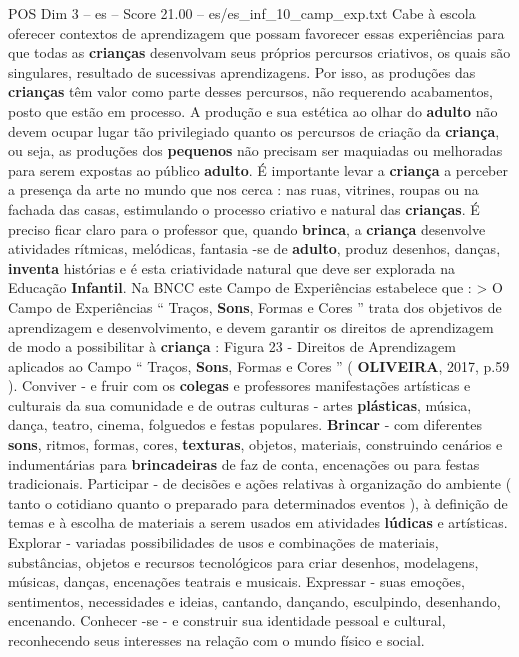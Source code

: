 \begin{textsample}{POS Dim 3 – es – Score 21.00 – es/es\_inf\_10\_camp\_exp.txt}
Cabe à escola oferecer contextos de aprendizagem que possam favorecer essas experiências para que todas as \textbf{crianças} desenvolvam seus próprios percursos criativos, os quais são singulares, resultado de sucessivas aprendizagens.
Por isso, as produções das \textbf{crianças} têm valor como parte desses percursos, não requerendo acabamentos, posto que estão em processo.
A produção e sua estética ao olhar do \textbf{adulto} não devem ocupar lugar tão privilegiado quanto os percursos de criação da \textbf{criança}, ou seja, as produções dos \textbf{pequenos} não precisam ser maquiadas ou melhoradas para serem expostas ao público \textbf{adulto}.
É importante levar a \textbf{criança} a perceber a presença da arte no mundo que nos cerca : nas ruas, vitrines, roupas ou na fachada das casas, estimulando o processo criativo e natural das \textbf{crianças}.
É preciso ficar claro para o professor que, quando \textbf{brinca}, a \textbf{criança} desenvolve atividades rítmicas, melódicas, fantasia -se de \textbf{adulto}, produz desenhos, danças, \textbf{inventa} histórias e é esta criatividade natural que deve ser explorada na Educação \textbf{Infantil}.
Na BNCC este Campo de Experiências estabelece que : > O Campo de Experiências “ Traços, \textbf{Sons}, Formas e Cores ” trata dos objetivos de aprendizagem e desenvolvimento, e devem garantir os direitos de aprendizagem de modo a possibilitar à \textbf{criança} : Figura 23 - Direitos de Aprendizagem aplicados ao Campo “ Traços, \textbf{Sons}, Formas e Cores ” ( \textbf{OLIVEIRA}, 2017, p.59 ).
Conviver - e fruir com os \textbf{colegas} e professores manifestações artísticas e culturais da sua comunidade e de outras culturas - artes \textbf{plásticas}, música, dança, teatro, cinema, folguedos e festas populares. \textbf{Brincar} - com diferentes \textbf{sons}, ritmos, formas, cores, \textbf{texturas}, objetos, materiais, construindo cenários e indumentárias para \textbf{brincadeiras} de faz de conta, encenações ou para festas tradicionais.
Participar - de decisões e ações relativas à organização do ambiente ( tanto o cotidiano quanto o preparado para determinados eventos ), à definição de temas e à escolha de materiais a serem usados em atividades \textbf{lúdicas} e artísticas.
Explorar - variadas possibilidades de usos e combinações de materiais, substâncias, objetos e recursos tecnológicos para criar desenhos, modelagens, músicas, danças, encenações teatrais e musicais.
Expressar - suas emoções, sentimentos, necessidades e ideias, cantando, dançando, esculpindo, desenhando, encenando.
Conhecer -se - e construir sua identidade pessoal e cultural, reconhecendo seus interesses na relação com o mundo físico e social.

\end{textsample}
